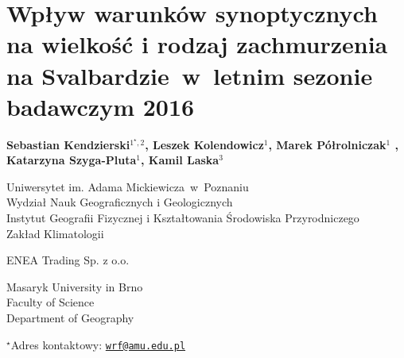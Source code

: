\documentclass[\main/boa.tex]{subfiles}
\begin{document}
\section{Wpływ warunków synoptycznych na wielkość i rodzaj zachmurzenia na Svalbardzie~w~letnim sezonie badawczym 2016}

\begin{center}
  {\bf  {} Sebastian Kendzierski$^{1^\star,2}$,  Leszek Kolendowicz$^{1}$,  Marek Półrolniczak$^{1}$ ,  Katarzyna Szyga-Pluta$^{1}$,   Kamil Laska$^{3}$}
\end{center}

\vskip 0.3cm

\begin{affiliations}
\begin{enumerate}
\begin{minipage}{0.915\textwidth}
\centering
\item Uniwersytet im. Adama Mickiewicza~w~Poznaniu \\ Wydział Nauk Geograficznych i Geologicznych  \\ Instytut Geografii Fizycznej i Kształtowania Środowiska Przyrodniczego\\
Zakład Klimatologii \\[-2pt]
\item ENEA Trading Sp. z o.o.
\item Masaryk University in Brno \\ Faculty of Science\\ Department of Geography
\end{minipage}
\end{enumerate}
$^\star$Adres kontaktowy: \href{mailto:wrf@amu.edu.pl}{\nolinkurl{wrf@amu.edu.pl}}\\
\end{affiliations}

\vskip 0.5cm


\vskip 0.5cm
\end{document}
